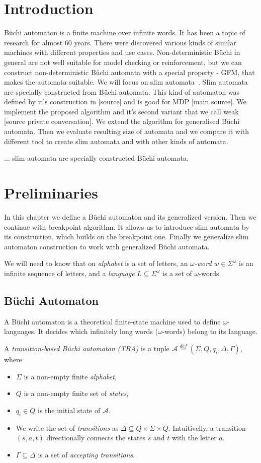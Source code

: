 \documentclass[
	digital
nolof, nolot
]{fithesis3}
\newcommand{\cA}{\mathcal{A}}
\newcommand{\eqdef}{\overset{def}{=}}
\begin{document}
	\chapter{Introduction}
	Büchi automaton is a finite machine over infinite words. It has been a topic of research for almost 60 years.
	There were discovered various kinds of similar machines with different properties and use cases.
	Non-deterministic Büchi in general are not well suitable for model checking or reinforcement, but we can construct non-deterministic Büchi automata with a special property - GFM, that makes the automata suitable. We will focus on slim automata~\cite{hlavni}.
	Slim automata are specially constructed from Büchi automata. This kind of automaton was defined by it's construction in [source] and is good for MDP [main source]. We implement the proposed algorithm and it's second variant that we call weak [source private conversation]. We extend the algorithm for generalised Büchi automata. Then we evaluate resulting size of automata and we compare it with different tool to create slim automata and with other kinds of automata.
	
	
	... slim automata are specially constructed Büchi automata.
	\chapter{Preliminaries}
		In this chapter we define a Büchi automaton and its generalized version.
		Then we continue with breakpoint algorithm. It allows us to introduce slim automata by its construction, which builds on the breakpoint one. Finally we generalize slim automaton construction to work with generalized Büchi automata.
		
		We will need to know that on \emph{alphabet} is a set of letters, an \emph{$\omega$-word} $w \in \Sigma^\omega$ is an infinite sequence of letters, and a \emph{language} $L \subseteq \Sigma^\omega$ is a set of $\omega$-words.
		\section{Büchi Automaton} \label{section:tba}
			A Büchi automaton is a theoretical finite-state machine used to define $\omega$-languages. It decides which infinitely long words ($\omega$-words) belong to its language.
			
			A \emph{transition-based Büchi automaton (TBA)} is a tuple $\cA\eqdef(\Sigma, Q, q_i, \Delta, \Gamma)$, where 
			\begin{itemize}
				\item $\Sigma$ is a non-empty finite \emph{alphabet},
				\item $Q$ is a non-empty finite set of \emph{states},
				\item $q_i \in Q$ is the initial state of $\cA$.
				\item We write the set of \emph{transitions} as $\Delta \subseteq Q \times \Sigma \times Q$. Intuitivelly, a transition $(s, a, t)$  directionally connects the states $s$ and $t$ with the letter $a$.
				\item $\Gamma \subseteq \Delta$ is a set of \emph{accepting transitions}.
			\end{itemize}
			
\end{document}
